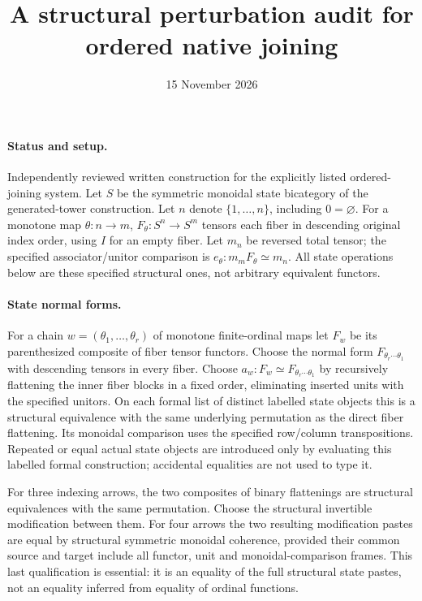 \documentclass{article}
\title{A structural perturbation audit for ordered native joining}
\date{15 November 2026}
\begin{document}
\maketitle
\paragraph{Status and setup.} Independently reviewed written construction for the explicitly listed ordered-joining system. Let $S$ be the symmetric monoidal state bicategory of the generated-tower construction. Let $n$ denote $\{1,\ldots,n\}$, including $0=\varnothing$. For a monotone map $\theta:n\to m$, $F_\theta:S^n\to S^m$ tensors each fiber in descending original index order, using $I$ for an empty fiber. Let $m_n$ be reversed total tensor; the specified associator/unitor comparison is $e_\theta:m_mF_\theta\simeq m_n$. All state operations below are these specified structural ones, not arbitrary equivalent functors.

\paragraph{State normal forms.} For a chain $w=(\theta_1,\ldots,\theta_r)$ of monotone finite-ordinal maps let $F_w$ be its parenthesized composite of fiber tensor functors. Choose the normal form $F_{\theta_r\cdots\theta_1}$ with descending tensors in every fiber. Choose $a_w:F_w\simeq F_{\theta_r\cdots\theta_1}$ by recursively flattening the inner fiber blocks in a fixed order, eliminating inserted units with the specified unitors. On each formal list of distinct labelled state objects this is a structural equivalence with the same underlying permutation as the direct fiber flattening. Its monoidal comparison uses the specified row/column transpositions. Repeated or equal actual state objects are introduced only by evaluating this labelled formal construction; accidental equalities are not used to type it.

For three indexing arrows, the two composites of binary flattenings are structural equivalences with the same permutation. Choose the structural invertible modification between them. For four arrows the two resulting modification pastes are equal by structural symmetric monoidal coherence, provided their common source and target include all functor, unit and monoidal-comparison frames. This last qualification is essential: it is an equality of the full structural state pastes, not an equality inferred from equality of ordinal functions.
\end{document}
